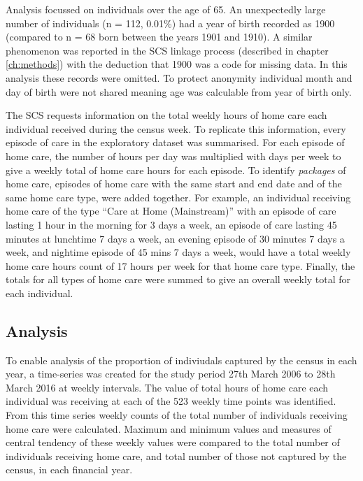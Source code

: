 \documentclass[]{article}
\begin{document}
Analysis focussed on individuals over the age of 65. An unexpectedly
large number of individuals (n = 112, 0.01\%) had a year of birth
recorded as 1900 (compared to n = 68 born between the years 1901 and
1910). A similar phenomenon was reported in the SCS linkage process
(described in chapter \ref{ch:methods}) with the deduction that 1900 was
a code for missing data. In this analysis these records were omitted. To
protect anonymity individual month and day of birth were not shared
meaning age was calculable from year of birth only.

The SCS requests information on the total weekly hours of home care each
individual received during the census week. To replicate this
information, every episode of care in the exploratory dataset was
summarised. For each episode of home care, the number of hours per day
was multiplied with days per week to give a weekly total of home care
hours for each episode. To identify \emph{packages} of home care,
episodes of home care with the same start and end date and of the same
home care type, were added together. For example, an individual
receiving home care of the type ``Care at Home (Mainstream)'' with an
episode of care lasting 1 hour in the morning for 3 days a week, an
episode of care lasting 45 minutes at lunchtime 7 days a week, an
evening episode of 30 minutes 7 days a week, and nightime episode of 45
mins 7 days a week, would have a total weekly home care hours count of
17 hours per week for that home care type. Finally, the totals for all
types of home care were summed to give an overall weekly total for each
individual.

\subsection{Analysis}\label{subsec:renf-methods-analysis}

To enable analysis of the proportion of indiviudals captured by the
census in each year, a time-series was created for the study period 27th
March 2006 to 28th March 2016 at weekly intervals. The value of total
hours of home care each individual was receiving at each of the 523
weekly time points was identified. From this time series weekly counts
of the total number of individuals receiving home care were calculated.
Maximum and minimum values and measures of central tendency of these
weekly values were compared to the total number of individuals receiving
home care, and total number of those not captured by the census, in each
financial year.
\end{document}
